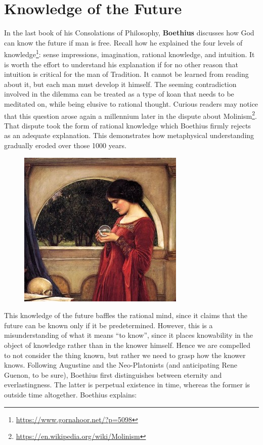\section{Knowledge of the Future}

In the last book of his Consolations of Philosophy, \textbf{Boethius} discusses how God can know the future if man is free. Recall how he explained the four levels of knowledge\footnote{\url{https://www.gornahoor.net/?p=5098}}: sense impressions, imagination, rational knowledge, and intuition. It is worth the effort to understand his explanation if for no other reason that intuition is critical for the man of Tradition. It cannot be learned from reading about it, but each man must develop it himself. The seeming contradiction involved in the dilemma can be treated as a type of koan that needs to be meditated on, while being elusive to rational thought. Curious readers may notice that this question arose again a millennium later in the dispute about Molinism\footnote{\url{https://en.wikipedia.org/wiki/Molinism}}. That dispute took the form of rational knowledge which Boethius firmly rejects as an adequate explanation. This demonstrates how metaphysical understanding gradually eroded over those 1000 years.

\begin{figure}
 \includegraphics[scale=.5]{a20121210KnowledgeoftheFuture-img001.jpg} 
\end{figure}

This knowledge of the future baffles the rational mind, since it claims that the future can be known only if it be predetermined. However, this is a misunderstanding of what it means “to know”, since it places knowability in the object of knowledge rather than in the knower himself. Hence we are compelled to not consider the thing known, but rather we need to grasp how the knower knows. Following Augustine and the Neo-Platonists (and anticipating Rene Guenon, to be sure), Boethius first distinguishes between eternity and everlastingness. The latter is perpetual existence in time, whereas the former is outside time altogether. Boethius explains:

